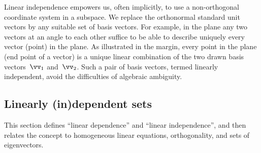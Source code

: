 Linear independence empowers us, often implicitly, to use a non-orthogonal coordinate system in a subspace.
We replace the orthonormal standard unit vectors by any suitable set of basis vectors.
%
For example, in the plane any two vectors at an angle to each other suffice to be able to describe uniquely every vector (point) in the plane.
As illustrated in the margin, every point in the plane (end point of a vector) is a unique linear combination of the two drawn basis vectors~\(\vv_1\) and~\(\vv_2\).
Such a pair of basis vectors, termed linearly independent, avoid the  difficulties of algebraic ambiguity.



\subsection{Linearly (in)dependent sets}

This section defines ``linear dependence'' and ``linear independence'', and then relates the concept to homogeneous linear equations, orthogonality, and sets of eigenvectors.

